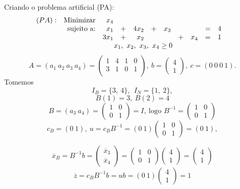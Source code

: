 \documentclass[12pt]{exam}
\begin{document}
\begin{questions}
\begin{solution}
	Criando o problema artificial (PA):
	\begin{equation*}	
			\begin{array}{c r r c r crcrc c c }
			(PA) :& \text{Minimizar}    & x_4   &    &           &    &         &      &        &  & &	\\
			           & \text{sujeito a:}   & x_1   & + & 4x_2  & + &  x_3 &      &        & =  &	 4 \\
			           &                              & 3x_1 & + & x_2    &     &        &  + &  x_4 & =  &	 1 \\
			           &                              & \multicolumn{6}{c}{x_1,~x_2,~x_3,~x_4 \geq 0}
			\end{array}	
	\end{equation*}
		$$A = (a_1~a_2~a_3~a_4) =\begin{pmatrix}
	1 & 4 & 1 & 0  \\ 
	3 & 1 & 0 & 1  \\ 
	\end{pmatrix},~
	b = \begin{pmatrix}
	4 \\ 
	1
	\end{pmatrix},~c = (0~0~0~1).$$
	Tomemos \\		
	$$I_B = \{3,~4\},~~I_N = \{1,~2\},$$
	$$B(1) = 3,~ B(2) = 4$$
		$$B = (a_3~a_4) =\begin{pmatrix}
	 1 & 0 \\ 
	 0 & 1
	\end{pmatrix} = I,~\text{logo } B^{-1} = \begin{pmatrix}
	 1 & 0 \\ 
	 0 & 1
	\end{pmatrix} $$
	$$c_B = (0~1),~u = c_BB^{-1} = (0~1)\begin{pmatrix}
	 1 & 0 \\ 
	 0 & 1
	\end{pmatrix} = (0~1),$$
	
	$$ \overline{x}_B =B^{-1}b = \begin{pmatrix}
	\overline{x}_3 \\ 
	\overline{x}_4 
	\end{pmatrix} = \begin{pmatrix}
	 1 & 0 \\ 
	 0 & 1
	\end{pmatrix} \begin{pmatrix}
	4 \\ 
	1
	\end{pmatrix} = \begin{pmatrix}
	4 \\ 
	1
	\end{pmatrix}$$
	$$\overline{z} = c_BB^{-1}b = ub = (0~1) \begin{pmatrix}
	4 \\ 
	1 
	\end{pmatrix} = 1$$	


\end{solution}
\end{questions}
\end{document}
